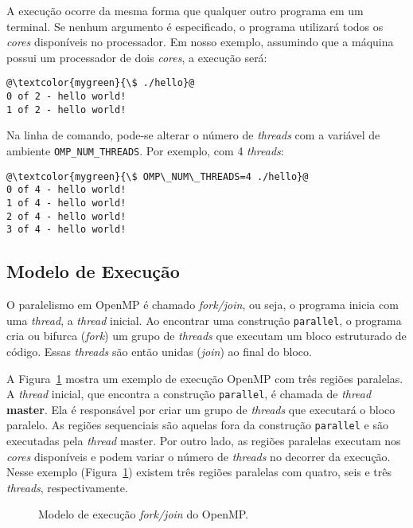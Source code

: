 A execução ocorre da mesma forma que qualquer outro programa em um terminal. Se nenhum argumento é especificado, o programa utilizará todos os \textit{cores} disponíveis no processador. Em nosso exemplo, assumindo que a máquina possui um processador de dois \textit{cores}, a execução será:

\begin{lstlisting}[frame=none, numbers=none]
@\textcolor{mygreen}{\$ ./hello}@
0 of 2 - hello world!
1 of 2 - hello world!
\end{lstlisting}

Na linha de comando, pode-se alterar o número de \textit{threads} com a variável de ambiente \verb+OMP_NUM_THREADS+. Por exemplo, com 4 \textit{threads}:
\begin{lstlisting}[frame=none, numbers=none]
@\textcolor{mygreen}{\$ OMP\_NUM\_THREADS=4 ./hello}@
0 of 4 - hello world!
1 of 4 - hello world!
2 of 4 - hello world!
3 of 4 - hello world!
\end{lstlisting}

\subsection{Modelo de Execução}
\label{sec:omp:modelo}

O paralelismo em OpenMP é chamado \emph{fork/join}, ou seja, o programa inicia com uma \textit{thread}, a \textit{thread} inicial. Ao encontrar uma construção \texttt{parallel}, o programa cria ou bifurca (\emph{fork}) um grupo de \textit{threads} que executam um bloco estruturado de código. Essas \textit{threads} são então unidas (\emph{join}) ao final do bloco.

A Figura~\ref{fig:omp:model} mostra um exemplo de execução OpenMP com três regiões paralelas. A \textit{thread} inicial, que encontra a construção \texttt{parallel}, é chamada de \textit{thread} \textbf{master}. Ela é responsável por criar um grupo de \textit{threads} que executará o bloco paralelo. As regiões sequenciais são aquelas fora da construção \texttt{parallel} e são executadas pela \textit{thread} master. Por outro lado, as regiões paralelas executam nos \textit{cores} disponíveis e podem variar o número de \emph{threads} no decorrer da execução. Nesse exemplo (Figura~\ref{fig:omp:model}) existem três regiões paralelas com quatro, seis e três \emph{threads}, respectivamente.

\begin{figure}[!htb]
\centering

\caption{Modelo de execução \emph{fork/join} do OpenMP.}
\label{fig:omp:model}
\end{figure}


